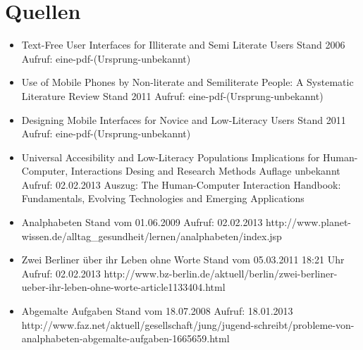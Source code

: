 \newpage 


\thispagestyle{empty}


 \section*{Quellen}



\begin{itemize}

  \item {}
					{Text-Free User Interfaces for Illiterate and Semi Literate Users}
					{Stand 2006}
					{Aufruf: }
					{eine-pdf-(Ursprung-unbekannt)}
	
	\item {}
					{Use of Mobile Phones by Non-literate and Semiliterate People: A Systematic Literature Review}
					{Stand 2011}
					{Aufruf: }
					{eine-pdf-(Ursprung-unbekannt)}
					
	\item {}
					{Designing Mobile Interfaces for Novice and Low-Literacy Users}
					{Stand 2011}
					{Aufruf: }
					{eine-pdf-(Ursprung-unbekannt)}

	\item {}
					{Universal Accesibility and Low-Literacy Populations}
					{Implications for Human-Computer, Interactions Desing and Research Methods}
					{Auflage unbekannt}
					{Aufruf: 02.02.2013}
					{Auszug: The Human-Computer Interaction Handbook: Fundamentals, Evolving Technologies and Emerging Applications}

	\item {}
						{Analphabeten}
						{Stand vom 01.06.2009}
						{Aufruf: 02.02.2013}
						{http://www.planet-wissen.de/alltag_gesundheit/lernen/analphabeten/index.jsp}
						
	\item {}
						{Zwei Berliner über ihr Leben ohne Worte}
						{Stand vom 05.03.2011 18:21 Uhr}
						{Aufruf: 02.02.2013}
						{http://www.bz-berlin.de/aktuell/berlin/zwei-berliner-ueber-ihr-leben-ohne-worte-article1133404.html}

	\item {}
						{Abgemalte Aufgaben}
						{Stand vom 18.07.2008}
						{Aufruf: 18.01.2013}
						{http://www.faz.net/aktuell/gesellschaft/jung/jugend-schreibt/probleme-von-analphabeten-abgemalte-aufgaben-1665659.html}									


\end{itemize}
